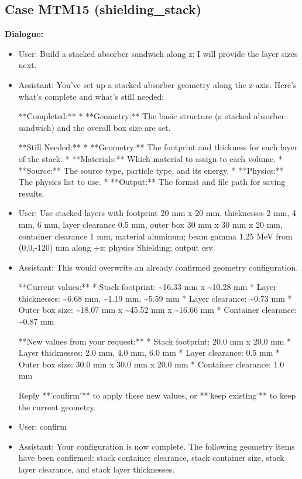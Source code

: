 \documentclass[11pt]{ctexart}
\begin{document}
\subsection{Case MTM15 (shielding\_stack)}
\textbf{Dialogue:}
\begin{itemize}
\item User: Build a stacked absorber sandwich along z; I will provide the layer sizes next.
\item Assistant: You've set up a stacked absorber geometry along the z-axis. Here's what's complete and what's still needed:

**Completed:**
*   **Geometry:** The basic structure (a stacked absorber sandwich) and the overall box size are set.

**Still Needed:**
*   **Geometry:** The footprint and thickness for each layer of the stack.
*   **Materials:** Which material to assign to each volume.
*   **Source:** The source type, particle type, and its energy.
*   **Physics:** The physics list to use.
*   **Output:** The format and file path for saving results.
\item User: Use stacked layers with footprint 20 mm x 20 mm, thicknesses 2 mm, 4 mm, 6 mm, layer clearance 0.5 mm, outer box 30 mm x 30 mm x 20 mm, container clearance 1 mm, material aluminum; beam gamma 1.25 MeV from (0,0,-120) mm along +z; physics Shielding; output csv.
\item Assistant: This would overwrite an already confirmed geometry configuration.

**Current values:**
*   Stack footprint: \textasciitilde{}16.33 mm x \textasciitilde{}10.28 mm
*   Layer thicknesses: \textasciitilde{}6.68 mm, \textasciitilde{}1.19 mm, \textasciitilde{}5.59 mm
*   Layer clearance: \textasciitilde{}0.73 mm
*   Outer box size: \textasciitilde{}18.07 mm x \textasciitilde{}45.52 mm x \textasciitilde{}16.66 mm
*   Container clearance: \textasciitilde{}0.87 mm

**New values from your request:**
*   Stack footprint: 20.0 mm x 20.0 mm
*   Layer thicknesses: 2.0 mm, 4.0 mm, 6.0 mm
*   Layer clearance: 0.5 mm
*   Outer box size: 30.0 mm x 30.0 mm x 20.0 mm
*   Container clearance: 1.0 mm

Reply **'confirm'** to apply these new values, or **'keep existing'** to keep the current geometry.
\item User: confirm
\item Assistant: Your configuration is now complete. The following geometry items have been confirmed: stack container clearance, stack container size, stack layer clearance, and stack layer thicknesses.
\end{itemize}
\end{document}
